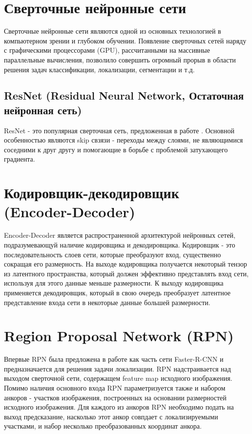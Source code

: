 \section{Сверточные нейронные сети}

Сверточные нейронные сети являются одной из основных технологией в компьютерном зрении и глубоком обучении. Появление сверточных сетей наряду с графическими процессорами (GPU), рассчитанными на массивные параллельные вычисления, позволило совершить огромный прорыв в области решения задач классификации, локализации, сегментации и т.д.

\subsection{ResNet (Residual Neural Network, Остаточная нейронная сеть)}

ResNet -  это популярная сверточная сеть, предложенная в работе \cite{he2016deep}. Основной особенностью являются skip свзязи - переходы между слоями, не являющимися соседними к друг другу и помогающие в борьбе с проблемой затухающего градиента.

\section{Кодировщик-декодировщик (Encoder-Decoder)}

Encoder-Decoder является распространенной архитектурой нейронных сетей, подразумевающуй наличие кодировщика и декодировщика. Кодировщик - это последовательность слоев сети, которые преобразуют вход, существенно сокращая его размерность. На выходе кодировщика получается некоторый тензор из латентного пространства, который должен эффективно представлять вход сети, используя для этого данные меньше размерности. К выходу кодировщика применяется декодировщик, который в свою очередь преобразует латентное представление входа сети в некоторые данные большей размерности.

\section{Region Proposal Network (RPN)}

Впервые RPN была предложена в работе \cite{ren2015faster} как часть сети Faster-R-CNN и предназначается для решения задачи локализации. RPN надстраивается над выходом сверточной сети, содержащем feature map исходного изображения. Помимо наличия основного входа RPN параметризуется также и набором анкоров - участков изображения, построенных на основании размерностей исходного изображения. Для каждого из анкоров RPN необходимо подать на выход предсказание, насколько этот анкор совпдает с локализируемыми участками, и набор несколько преобразованных координат анкора.

